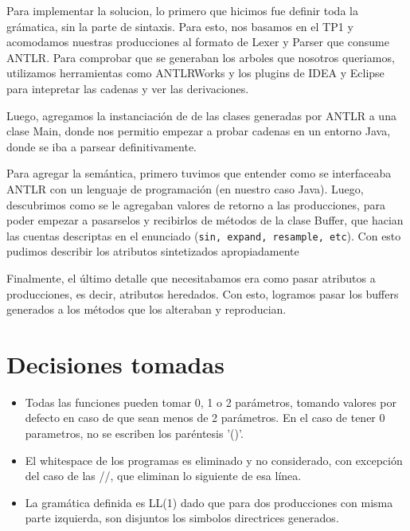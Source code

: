 \documentclass[a4paper]{article}
\begin{document}
Para implementar la solucion, lo primero que hicimos fue definir toda la
gr\'amatica, sin la parte de sintaxis. Para esto, nos basamos en el TP1 y
acomodamos nuestras producciones al formato de Lexer y Parser que consume ANTLR.
Para comprobar que se generaban los arboles que nosotros queriamos, utilizamos
herramientas como ANTLRWorks y los plugins de IDEA y Eclipse para intepretar 
las cadenas y ver las derivaciones. 

Luego, agregamos la instanciaci\'on de de las clases generadas por ANTLR
a una clase Main, donde nos permitio empezar a probar cadenas en un 
entorno Java, donde se iba a parsear definitivamente.

Para agregar la sem\'antica, primero tuvimos que entender como se interfaceaba
ANTLR con un lenguaje de programaci\'on (en nuestro caso Java). Luego, descubrimos
como se le agregaban valores de retorno a las producciones, para poder empezar
a pasarselos y recibirlos de m\'etodos de la clase Buffer, que hacian las cuentas
descriptas en el enunciado (\texttt{sin, expand, resample, etc}). Con esto
pudimos describir los atributos sintetizados apropiadamente

Finalmente, el \'ultimo detalle que necesitabamos era como pasar atributos a
producciones, es decir, atributos heredados. Con esto, logramos pasar
los buffers generados a los m\'etodos que los alteraban y reproducian.






\section{Decisiones tomadas}
\begin{itemize}
\item Todas las funciones  pueden tomar 0, 1 o 2 parámetros, tomando valores por defecto en caso de que sean menos de 2 parámetros. En el caso de tener 0 parametros, no se escriben los paréntesis '()'.

\item El whitespace de los programas es eliminado y no considerado, con excepción del caso de las //, que eliminan lo siguiente de esa línea.

\item La gramática definida es LL(1) dado que para dos producciones con misma parte izquierda, son disjuntos los simbolos directrices generados.
\end{itemize}
\end{document}
